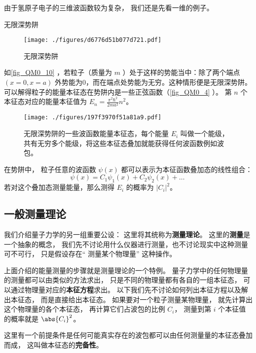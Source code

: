 由于氢原子电子的三维波函数较为复杂， 我们还是先看一维的例子。

\begin{example}{无限深势阱}
\begin{figure}[ht]
\centering
\texttt{[image: ./figures/d6776d51b077d721.pdf]}
\caption{无限深势阱} \label{fig_QM0_10}
\end{figure}
如\autoref{fig_QM0_10} ，若粒子（质量为 $m$ ）处于这样的势能当中：除了两个端点 $(x=0,x=a)$ 外势能为0，而在端点处势能为无穷。这种情形便是无限深势阱。 可以解得粒子的能量本征态在势阱内是一些正弦函数（\autoref{fig_QM0_4} ）。 第 $n$ 个本征态对应的能量本征值为 $E_n=\frac{\pi^2\hbar^2}{2ma^2}n^2$。

\begin{figure}[ht]
\centering
\texttt{[image: ./figures/197f3970f51a81a9.pdf]}
\caption{无限深势阱的一些波函数能量本征态，每个能量 $E_i$ 叫做一个能级，共有无穷多个能级，将这些本征态叠加就能获得任何波函数例如波包。} \label{fig_QM0_4}
\end{figure}

在势阱中， 粒子任意的波函数 $\psi(x)$ 都可以表示为本征函数叠加态的线性组合：
\begin{equation}
\psi(x) = C_1\psi_1(x) + C_2\psi_2(x) + \dots~
\end{equation}
若对这个叠加态测量能量，那么测得 $E_i$ 的概率为 $|C_i|^2$。
\end{example}


\subsection{一般测量理论}
我们介绍量子力学的另一组重要公设： 这里将其统称为\textbf{测量理论}。 这里的\textbf{测量}是一个抽象的概念， 我们先不讨论用什么仪器进行测量，也不讨论现实中这种测量可不可行， 只是假设存在“ 测量某个物理量” 这种操作。

上面介绍的能量测量的步骤就是测量理论的一个特例。 量子力学中的任何物理量的测量都可以由类似的方法求出， 只是不同的物理量都有各自的一组本征态， 可以通过物理量对应的\textbf{本征方程}求出。 以下我们先不讨论如何列出本征方程以及解出本征态， 而是直接给出本征态。 如果要对一个粒子测量某物理量， 就先计算出这个物理量的各个本征态， 再计算它们占波包的比例 $C_i$， 测量到第 $i$ 个本征值的概率就是 $\abs{C_i}^2$。

这里有一个前提条件是任何可能真实存在的波包都可以由任何测量量的本征态叠加而成， 这叫做本征态的\textbf{完备性}。

